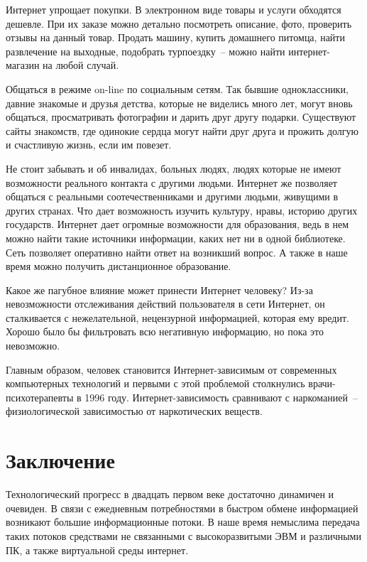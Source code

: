   Интернет упрощает покупки. В электронном виде товары и услуги обходятся
  дешевле. При их заказе можно детально посмотреть описание, фото, проверить
  отзывы на данный товар. Продать машину, купить домашнего питомца, найти
  развлечение на выходные, подобрать турпоездку~-- можно найти интернет-магазин
  на любой случай.
         
  Общаться в режиме on-line по социальным сетям. Так бывшие одноклассники,
  давние знакомые и друзья детства, которые не виделись много лет, могут вновь
  общаться, просматривать фотографии и дарить друг другу подарки. Существуют
  сайты знакомств, где одинокие сердца могут найти друг друга и прожить долгую
  и счастливую жизнь, если им повезет.
  
  Не стоит забывать и об инвалидах, больных людях, людях которые не имеют
  возможности реального контакта с другими людьми. Интернет же позволяет
  общаться с реальными соотечественниками и другими людьми, живущими в других
  странах. Что дает возможность изучить культуру, нравы, историю других
  государств. Интернет дает огромные возможности для образования, ведь в нем
  можно найти такие источники информации, каких нет ни в одной библиотеке. Сеть
  позволяет оперативно найти ответ на возникший вопрос. А также в наше время
  можно получить дистанционное образование.
   
  Какое же пагубное влияние может принести Интернет человеку? Из-за
  невозможности отслеживания действий пользователя в сети Интернет, он
  сталкивается с нежелательной, нецензурной информацией, которая ему вредит.
  Хорошо было бы фильтровать всю негативную информацию, но пока это невозможно.
       
  Главным образом, человек становится Интернет-зависимым от современных
  компьютерных технологий и первыми с этой проблемой столкнулись
  врачи-психотерапевты в 1996 году. Интернет-зависимость сравнивают с
  наркоманией~-- физиологической зависимостью от наркотических веществ.
      
  \section*{Заключение}
  
  Технологический прогресс в двадцать первом веке достаточно динамичен и
  очевиден. В связи с ежедневным потребностями в быстром обмене информацией
  возникают большие информационные потоки. В наше время немыслима передача
  таких потоков средствами не связанными с высокоразвитыми ЭВМ и различными ПК,
  а также виртуальной среды интернет.
  	
